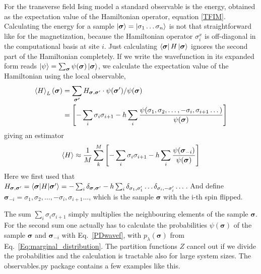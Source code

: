 \documentclass[submission, Phys]{SciPost}
\begin{document}
For the transverse field Ising model a standard observable is the energy, obtained as the expectation value of
the Hamiltonian operator, equation \ref{TFIM}.
Calculating the energy for a sample $\ket{\bm{\sigma} }= \ket{\sigma_1 \dots  \sigma_n}$ is not that straightforward like for the magnetization, because the Hamiltonian operator ${\sigma}^x_i$ is off-diagonal in the computational basis at site $i$. Just calculating $\bra{\bm{\sigma} } H \ket{\bm{\sigma} }$ ignores the second part of the Hamiltonian completely. 
If we write the wavefunction in its expanded form reads $\ket{\psi} = \sum_{\bm{\sigma}} \psi(\bm{\sigma}) \ket{\bm{\sigma}} $, we calculate the expectation value of the Hamiltonian using the local observable,
\begin{align}
\braket{ H}_L({\bm{\sigma}}) &= \sum_{ \bm{\sigma'}} H_{\bm{\sigma}, \bm{\sigma}'} \cdot \psi(\bm{\sigma}') / \psi(\bm{\sigma}) \\
&=   \left[ -\sum_i \sigma_i \sigma_{i+1} - h \sum_i \frac{\psi(\sigma_1, \sigma_2, \dots , -\sigma_i, \sigma_{i+1} \dots)}{\psi (\bm{\sigma})} \right]
\end{align}
giving an estimator
\begin{equation}
\braket{ H} \approx \frac{1}{M} \sum_k^M \left[ -\sum_i \sigma_i \sigma_{i+1} - h \sum_i \frac{\psi (\bm{\sigma}_{-i})}{\psi (\bm{\sigma})} \right]
\end{equation}
Here we first used that $H_{\bm{\sigma}, \bm{\sigma}'}  = \braket{\bm{\sigma} | H | \bm{\sigma}'} = -\sum_i \delta_{\bm{\sigma}, \bm{\sigma}'} - h \sum_i \delta_{\sigma_1, \sigma_1'} \dots \delta_{\sigma_i, -\sigma_i'} \dots$. And define $\bm{\sigma}_{-i} = \sigma_1, \sigma_2, \dots , -\sigma_i, \sigma_{i+1} \dots$, which is the sample $\bm{\sigma}$ with the i-th spin flipped.

The sum $\sum_i \sigma_i \sigma_{i+1}$ simply multiplies the neighbouring elements of the sample $\bm{\sigma}$. For the second sum one actually has to calculate the probabilities $\psi (\bm{\sigma})$ of the sample $\bm{\sigma}$ and $\bm{\sigma}_{-i} $ with
Eq.~\ref{PDwavef},
with $p_{\lambda}(\bm{\sigma})$ from Eq.~\ref{Eq:marginal_distribution}. The partition functions $Z$ cancel out if we divide the probabilities and the calculation is tractable also for large system sizes.
The observables.py package contains a few examples like this.
\end{document}
